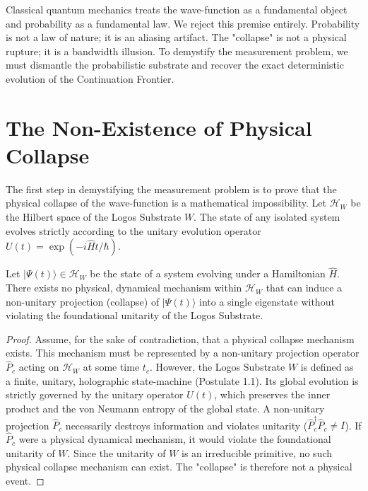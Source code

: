 \documentclass[12pt,twoside]{extbook}
\theoremstyle{definition}
\theoremstyle{remark}
\begin{document}
Classical quantum mechanics treats the wave-function as a fundamental object and probability as a fundamental law. We reject this premise entirely. Probability is not a law of nature; it is an aliasing artifact. The "collapse" is not a physical rupture; it is a bandwidth illusion. To demystify the measurement problem, we must dismantle the probabilistic substrate and recover the exact deterministic evolution of the Continuation Frontier.

\section{The Non-Existence of Physical Collapse}
The first step in demystifying the measurement problem is to prove that the physical collapse of the wave-function is a mathematical impossibility. Let $\mathcal{H}_W$ be the Hilbert space of the Logos Substrate $W$. The state of any isolated system evolves strictly according to the unitary evolution operator $U(t) = \exp(-i\hat{H}t/\hbar)$.

\begin{theorem}
Let $|\Psi(t)\rangle \in \mathcal{H}_W$ be the state of a system evolving under a Hamiltonian $\hat{H}$. There exists no physical, dynamical mechanism within $\mathcal{H}_W$ that can induce a non-unitary projection (collapse) of $|\Psi(t)\rangle$ into a single eigenstate without violating the foundational unitarity of the Logos Substrate.
\end{theorem}

\begin{proof}
Assume, for the sake of contradiction, that a physical collapse mechanism exists. This mechanism must be represented by a non-unitary projection operator $\hat{P}_c$ acting on $\mathcal{H}_W$ at some time $t_c$. However, the Logos Substrate $W$ is defined as a finite, unitary, holographic state-machine (Postulate 1.1). Its global evolution is strictly governed by the unitary operator $U(t)$, which preserves the inner product and the von Neumann entropy of the global state. A non-unitary projection $\hat{P}_c$ necessarily destroys information and violates unitarity ($\hat{P}_c^\dagger \hat{P}_c \neq I$). If $\hat{P}_c$ were a physical dynamical mechanism, it would violate the foundational unitarity of $W$. Since the unitarity of $W$ is an irreducible primitive, no such physical collapse mechanism can exist. The "collapse" is therefore not a physical event.
\end{proof}
\end{document}
